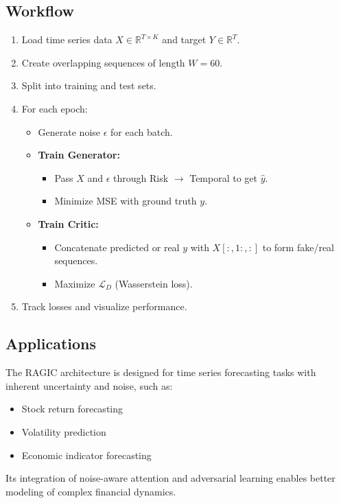\subsection{Workflow}

\begin{enumerate}
    \item Load time series data $X \in \mathbb{R}^{T \times K}$ and target $Y \in \mathbb{R}^T$.
    \item Create overlapping sequences of length $W=60$.
    \item Split into training and test sets.
    \item For each epoch:
    \begin{itemize}
        \item Generate noise $\epsilon$ for each batch.
        \item \textbf{Train Generator:}
            \begin{itemize}
                \item Pass $X$ and $\epsilon$ through Risk $\rightarrow$ Temporal to get $\hat{y}$.
                \item Minimize MSE with ground truth $y$.
            \end{itemize}
        \item \textbf{Train Critic:}
            \begin{itemize}
                \item Concatenate predicted or real $y$ with $X[:, 1:, :]$ to form fake/real sequences.
                \item Maximize $\mathcal{L}_D$ (Wasserstein loss).
            \end{itemize}
    \end{itemize}
    \item Track losses and visualize performance.
\end{enumerate}

\subsection{Applications}

The RAGIC architecture is designed for time series forecasting tasks with inherent uncertainty and noise, such as:
\begin{itemize}
    \item Stock return forecasting
    \item Volatility prediction
    \item Economic indicator forecasting
\end{itemize}

Its integration of noise-aware attention and adversarial learning enables better modeling of complex financial dynamics.
